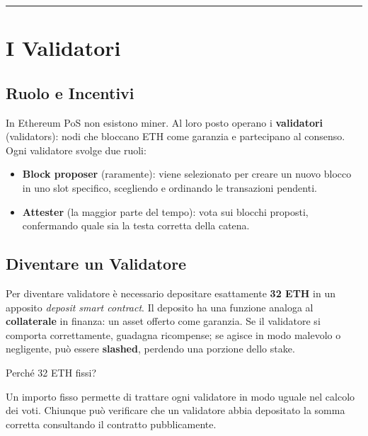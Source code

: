 \documentclass[
  italian,
  openany]{book}
\providecommand{\tightlist}{%
  \setlength{\itemsep}{0pt}\setlength{\parskip}{0pt}}
\begin{document}
\begin{center}\rule{0.5\linewidth}{0.5pt}\end{center}

\section{I Validatori}\label{i-validatori}

\subsection{Ruolo e Incentivi}\label{ruolo-e-incentivi}

In Ethereum PoS non esistono miner. Al loro posto operano i
\textbf{validatori} (validators): nodi che bloccano ETH come garanzia e
partecipano al consenso. Ogni validatore svolge due ruoli:

\begin{itemize}
\tightlist
\item
  \textbf{Block proposer} (raramente): viene selezionato per creare un
  nuovo blocco in uno slot specifico, scegliendo e ordinando le
  transazioni pendenti.
\item
  \textbf{Attester} (la maggior parte del tempo): vota sui blocchi
  proposti, confermando quale sia la testa corretta della catena.
\end{itemize}

\subsection{Diventare un Validatore}\label{diventare-un-validatore}

Per diventare validatore è necessario depositare esattamente \textbf{32
ETH} in un apposito \emph{deposit smart contract}. Il deposito ha una
funzione analoga al \textbf{collaterale} in finanza: un asset offerto
come garanzia. Se il validatore si comporta correttamente, guadagna
ricompense; se agisce in modo malevolo o negligente, può essere
\textbf{slashed}, perdendo una porzione dello stake.

\begin{calloutnote}{Perché 32 ETH fissi?}

Un importo fisso permette di trattare ogni validatore in modo uguale nel
calcolo dei voti. Chiunque può verificare che un validatore abbia
depositato la somma corretta consultando il contratto pubblicamente.

\end{calloutnote}
\end{document}
